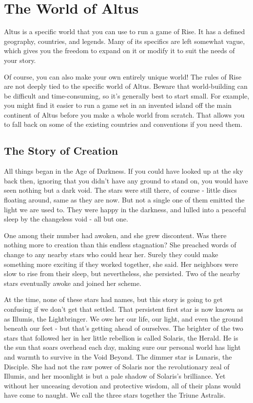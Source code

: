 \chapter{The World of Altus}

Altus is a specific world that you can use to run a game of Rise.
It has a defined geography, countries, and legends.
Many of its specifics are left somewhat vague, which gives you the freedom to expand on it or modify it to suit the needs of your story.

Of course, you can also make your own entirely unique world!
The rules of Rise are not deeply tied to the specific world of Altus.
Beware that world-building can be difficult and time-consuming, so it's generally best to start small.
For example, you might find it easier to run a game set in an invented island off the main continent of Altus before you make a whole world from scratch.
That allows you to fall back on some of the existing countries and conventions if you need them.

\section{The Story of Creation}

  All things began in the Age of Darkness.
  If you could have looked up at the sky back then, ignoring that you didn't have any ground to stand on, you would have seen nothing but a dark void.
  The stars were still there, of course - little discs floating around, same as they are now.
  But not a single one of them emitted the light we are used to.
  They were happy in the darkness, and lulled into a peaceful sleep by the changeless void - all but one.

  One among their number had awoken, and she grew discontent.
  Was there nothing more to creation than this endless stagnation?
  She preached words of change to any nearby stars who could hear her.
  Surely they could make something more exciting if they worked together, she said.
  Her neighbors were slow to rise from their sleep, but nevertheless, she persisted.
  Two of the nearby stars eventually awoke and joined her scheme.

  At the time, none of these stars had names, but this story is going to get confusing if we don't get that settled.
  That persistent first star is now known as as Illumis, the Lightbringer.
  We owe her our life, our light, and even the ground beneath our feet - but that's getting ahead of ourselves.
  The brighter of the two stars that followed her in her little rebellion is called Solaris, the Herald.
  He is the sun that soars overhead each day, making sure our personal world has light and warmth to survive in the Void Beyond.
  The dimmer star is Lunaris, the Disciple.
  She had not the raw power of Solaris nor the revolutionary zeal of Illumis, and her moonlight is but a pale shadow of Solaris's brilliance.
  Yet without her unceasing devotion and protective wisdom, all of their plans would have come to naught.
  We call the three stars together the Triune Astralis.

